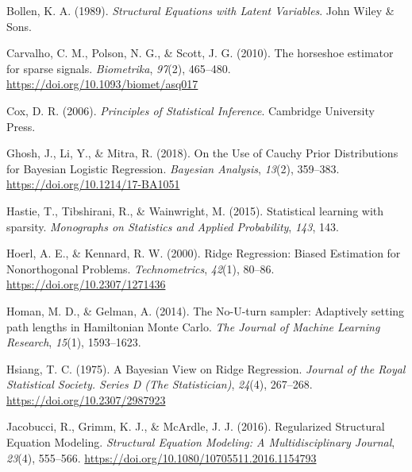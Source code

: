 \documentclass[
  english,
  man]{apa6}
\newlength{\cslhangindent}
\newlength{\cslentryspacingunit} %
\newenvironment{CSLReferences}[2] %
 {%
  \setlength{\parindent}{0pt}
  \ifodd #1
  \let\oldpar\par
  \def\par{\hangindent=\cslhangindent\oldpar}
  \fi
  \setlength{\parskip}{#2\cslentryspacingunit}
 }%
 {}
\begin{document}
\hypertarget{refs}{}
\begin{CSLReferences}{1}{0}
\leavevmode{}%
Bollen, K. A. (1989). \emph{Structural {Equations} with {Latent} {Variables}}. John Wiley \& Sons.

\leavevmode{}%
Carvalho, C. M., Polson, N. G., \& Scott, J. G. (2010). The horseshoe estimator for sparse signals. \emph{Biometrika}, \emph{97}(2), 465--480. \url{https://doi.org/10.1093/biomet/asq017}

\leavevmode{}%
Cox, D. R. (2006). \emph{Principles of {Statistical} {Inference}}. Cambridge University Press.

\leavevmode{}%
Ghosh, J., Li, Y., \& Mitra, R. (2018). On the {Use} of {Cauchy} {Prior} {Distributions} for {Bayesian} {Logistic} {Regression}. \emph{Bayesian Analysis}, \emph{13}(2), 359--383. \url{https://doi.org/10.1214/17-BA1051}

\leavevmode{}%
Hastie, T., Tibshirani, R., \& Wainwright, M. (2015). Statistical learning with sparsity. \emph{Monographs on Statistics and Applied Probability}, \emph{143}, 143.

\leavevmode{}%
Hoerl, A. E., \& Kennard, R. W. (2000). Ridge {Regression}: {Biased} {Estimation} for {Nonorthogonal} {Problems}. \emph{Technometrics}, \emph{42}(1), 80--86. \url{https://doi.org/10.2307/1271436}

\leavevmode{}%
Homan, M. D., \& Gelman, A. (2014). The {No}-{U}-turn sampler: Adaptively setting path lengths in {Hamiltonian} {Monte} {Carlo}. \emph{The Journal of Machine Learning Research}, \emph{15}(1), 1593--1623.

\leavevmode{}%
Hsiang, T. C. (1975). A {Bayesian} {View} on {Ridge} {Regression}. \emph{Journal of the Royal Statistical Society. Series D (The Statistician)}, \emph{24}(4), 267--268. \url{https://doi.org/10.2307/2987923}

\leavevmode{}%
Jacobucci, R., Grimm, K. J., \& McArdle, J. J. (2016). Regularized {Structural} {Equation} {Modeling}. \emph{Structural Equation Modeling: A Multidisciplinary Journal}, \emph{23}(4), 555--566. \url{https://doi.org/10.1080/10705511.2016.1154793}


\end{CSLReferences}
\end{document}

